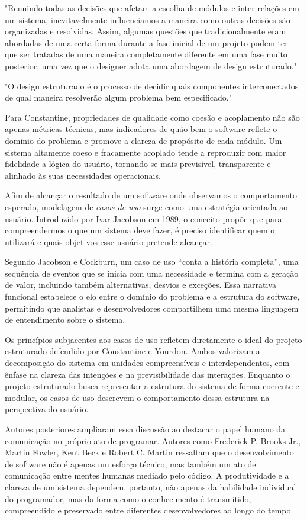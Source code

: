 \documentclass[12pt,a4paper]{article}
\begin{document}
"Reunindo todas as decisões que afetam a escolha de módulos e inter-relações em um sistema, inevitavelmente influenciamos a maneira como outras decisões são organizadas e resolvidas. Assim, algumas questões que tradicionalmente eram abordadas de uma certa forma durante a fase inicial de um projeto podem ter que ser tratadas de uma maneira completamente diferente em uma fase muito posterior, uma vez que o designer adota uma abordagem de design estruturado."

"O design estruturado é o processo de decidir quais componentes interconectados de qual maneira resolverão algum problema bem especificado."

Para Constantine, propriedades de qualidade como coesão e acoplamento não são apenas métricas técnicas, mas indicadores de quão bem o software reflete o domínio do problema e promove a clareza de propósito de cada módulo. Um sistema altamente coeso e fracamente acoplado tende a reproduzir com maior fidelidade a lógica do usuário, tornando-se mais previsível, transparente e alinhado às suas necessidades operacionais.

Afim de alcançar o resultado de um software onde observamos o comportamento esperado, modelagem de \textit{casos de uso} surge como uma estratégia orientada ao usuário. Introduzido por Ivar Jacobson em 1989, o conceito propõe que para compreendermos o que um sistema deve fazer, é preciso identificar quem o utilizará e quais objetivos esse usuário pretende alcançar. 

Segundo Jacobson e Cockburn, um caso de uso “conta a história completa”, uma sequência de eventos que se inicia com uma necessidade e termina com a geração de valor, incluindo também alternativas, desvios e exceções. Essa narrativa funcional estabelece o elo entre o domínio do problema e a estrutura do software, permitindo que analistas e desenvolvedores compartilhem uma mesma linguagem de entendimento sobre o sistema.

Os princípios subjacentes aos casos de uso refletem diretamente o ideal do projeto estruturado defendido por Constantine e Yourdon. Ambos valorizam a decomposição do sistema em unidades compreensíveis e interdependentes, com ênfase na clareza das intenções e na previsibilidade das interações. Enquanto o projeto estruturado busca representar a estrutura do sistema de forma coerente e modular, os casos de uso descrevem o comportamento dessa estrutura na perspectiva do usuário.

Autores posteriores ampliaram essa discussão ao destacar o papel humano da comunicação no próprio ato de programar. Autores como Frederick P. Brooks Jr., Martin Fowler, Kent Beck e Robert C. Martin ressaltam que o desenvolvimento de software não é apenas um esforço técnico, mas também um ato de comunicação entre mentes humanas mediado pelo código. A produtividade e a clareza de um sistema dependem, portanto, não apenas da habilidade individual do programador, mas da forma como o conhecimento é transmitido, compreendido e preservado entre diferentes desenvolvedores ao longo do tempo.
\end{document}

